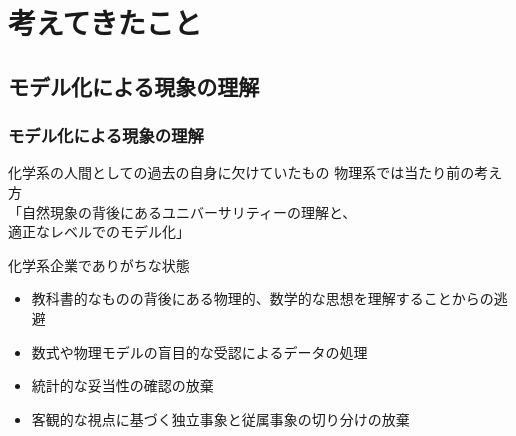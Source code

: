 \documentclass[12pt, dvipdfmx]{beamer}
\begin{document}
\section{考えてきたこと}
\subsection{モデル化による現象の理解}
\begin{frame}
    \frametitle{モデル化による現象の理解}
    \begin{alertblock}{化学系の人間としての過去の自身に欠けていたもの}
        物理系では当たり前の考え方\\
        「自然現象の背後にあるユニバーサリティーの理解と、\\適正なレベルでのモデル化」
    \end{alertblock}

    \begin{block}{化学系企業でありがちな状態}
        \begin{itemize}
            \item 教科書的なものの背後にある物理的、数学的な思想を理解することからの逃避
            \item 数式や物理モデルの盲目的な受認によるデータの処理
            \item 統計的な妥当性の確認の放棄
            \item 客観的な視点に基づく独立事象と従属事象の切り分けの放棄
        \end{itemize}
    \end{block}
\end{frame}
\end{document}
